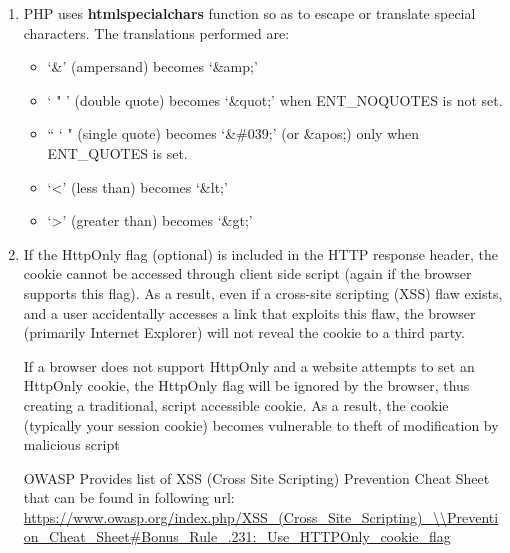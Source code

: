 \documentclass[12pt]{extarticle}
\begin{document}
\vspace{2mm}
\begin{enumerate}
	\item{PHP uses \textbf{htmlspecialchars} function so as to escape or translate special characters. The translations performed are\cite{php-htmlspecialchars}:
	\begin{itemize}
		\item `\&' (ampersand) becomes `\&amp;'
		\item ` " ' (double quote) becomes `\&quot;' when ENT\_NOQUOTES is not set.
		\item `` ` " (single quote) becomes `\&\#039;' (or \&apos;) only when ENT\_QUOTES is set. 
		\item `\textless' (less than) becomes `\&lt;'
		\item `\textgreater' (greater than) becomes `\&gt;'
	\end{itemize}		
	}
	 
	\item{	If the HttpOnly flag (optional) is included in the HTTP response header, the cookie cannot be accessed through client side script (again if the browser supports this flag). As a result, even if a cross-site scripting (XSS) flaw exists, and a user accidentally accesses a link that exploits this flaw, the browser (primarily Internet Explorer) will not reveal the cookie to a third party.
	
	If a browser does not support HttpOnly and a website attempts to set an HttpOnly cookie, the HttpOnly flag will be ignored by the browser, thus creating a traditional, script accessible cookie. As a result, the cookie (typically your session cookie) becomes vulnerable to theft of modification by malicious script	}
	
	OWASP Provides list of XSS (Cross Site Scripting) Prevention Cheat Sheet that can be found in following url:\\
	\url{https://www.owasp.org/index.php/XSS_(Cross_Site_Scripting)_\\Prevention_Cheat_Sheet#Bonus_Rule_.231:_Use_HTTPOnly_cookie_flag}
	
\end{enumerate}



\end{document}
